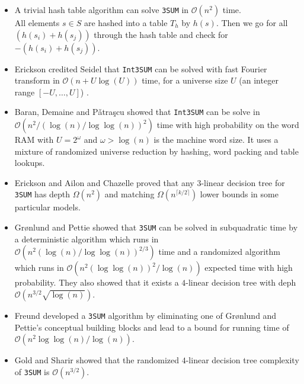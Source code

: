 \begin{itemize}
    \item A trivial hash table algorithm can solve \texttt{3SUM} in $\mathcal{O}\left(n^{2}\right)$ time.\\
        All elements $s \in S$ are hashed into a table $T_{h}$ by $h\left(s\right)$. Then we go for all $\left(h\left(s_{i}\right) + h\left(s_{j}\right)\right)$ through the hash table and check for $-\left(h\left(s_{i}\right) + h\left(s_{j}\right)\right)$.
    \item Erickson \cite{erickson1995lower} credited Seidel \cite{edelsbrunner1986constructing} that \texttt{Int3SUM} can be solved with fast Fourier transform in $\mathcal{O}\left(n + U\log\left(U\right)\right)$ time, for a universe size $U$ (an integer range $[-U, \dots, U]$) \cite{harper1975sorting}.
    \item Baran, Demaine and Pǎtra{\c{s}}cu \cite{baran2005subquadratic} showed that \texttt{Int3SUM} can be solve in $\mathcal{O}\left(n^{2}/\left(\log\left(n\right)/\log \log\left(n\right)\right)^{2}\right)$ time with high probability on the word RAM with $U = 2^{\omega}$ and $\omega > \log\left(n\right)$ is the machine word size. It uses a mixture of randomized universe reduction by hashing, word packing and table lookups.
    \item Erickson \cite{erickson1995lower} and Ailon and Chazelle \cite{ailon2005lower} proved that any $3$-linear decision tree for \texttt{3SUM} has depth $\Omega\left(n^{2}\right)$ and matching $\Omega\left(n^{\lceil k/2 \rceil}\right)$ lower bounds in some particular models.
    \item Grønlund and Pettie \cite{grnlund2014threesomes} showed that \texttt{3SUM} can be solved in subquadratic time by a deterministic algorithm which runs in $\mathcal{O}\left(n^{2}\left(\log\left(n\right) / \log \log\left(n\right)\right)^{2/3}\right)$ time and a randomized algorithm which runs in $\mathcal{O}\left(n^{2}\left(\log \log\left(n\right)\right)^{2} / \log \left(n\right)\right)$ expected time with high probability. They also showed that it exists a $4$-linear decision tree with deph $\mathcal{O}\left(n^{3/2} \sqrt{\log\left(n\right)}\right)$.
    \item Freund \cite{freund2017improved} developed a \texttt{3SUM} algorithm by eliminating one of Grønlund and Pettie's conceptual building blocks and lead to a bound for running time of $\mathcal{O}\left(n^{2} \log \log\left(n\right)/\log\left(n\right)\right)$.
    \item Gold and Sharir \cite{gold_et_al:LIPIcs:2017:7836} showed that the randomized $4$-linear decision tree complexity of \texttt{3SUM} is $\mathcal{O}\left(n^{3/2}\right)$.

\end{itemize}
